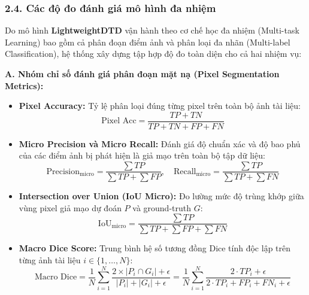 \subsubsection{2.4. Các độ đo đánh giá mô hình đa nhiệm}
\indent\indent Do mô hình \textbf{LightweightDTD} vận hành theo cơ chế học đa nhiệm (Multi-task Learning) bao gồm cả phân đoạn điểm ảnh và phân loại đa nhãn (Multi-label Classification), hệ thống xây dựng tập hợp độ đo toàn diện cho cả hai nhiệm vụ:\vspace{0.2cm}

\textbf{A. Nhóm chỉ số đánh giá phân đoạn mặt nạ (Pixel Segmentation Metrics):}
\begin{itemize}[label={--}, itemsep=2pt]
    \item \textbf{Pixel Accuracy:} Tỷ lệ phân loại đúng từng pixel trên toàn bộ ảnh tài liệu:
    \begin{equation}
    \text{Pixel Acc} = \frac{TP + TN}{TP + TN + FP + FN}
    \end{equation}
    \item \textbf{Micro Precision và Micro Recall:} Đánh giá độ chuẩn xác và độ bao phủ của các điểm ảnh bị phát hiện là giả mạo trên toàn bộ tập dữ liệu:
    \begin{equation}
    \text{Precision}_{\text{micro}} = \frac{\sum TP}{\sum TP + \sum FP}, \quad \text{Recall}_{\text{micro}} = \frac{\sum TP}{\sum TP + \sum FN}
    \end{equation}
    \item \textbf{Intersection over Union (IoU Micro):} Đo lường mức độ trùng khớp giữa vùng pixel giả mạo dự đoán $P$ và ground-truth $G$:
    \begin{equation}
    \text{IoU}_{\text{micro}} = \frac{\sum TP}{\sum TP + \sum FP + \sum FN}
    \end{equation}
    \item \textbf{Macro Dice Score:} Trung bình hệ số tương đồng Dice tính độc lập trên từng ảnh tài liệu $i \in \{1, \dots, N\}$:
    \begin{equation}
    \text{Macro Dice} = \frac{1}{N} \sum_{i=1}^{N} \frac{2 \times |P_i \cap G_i| + \epsilon}{|P_i| + |G_i| + \epsilon} = \frac{1}{N} \sum_{i=1}^{N} \frac{2 \cdot TP_i + \epsilon}{2 \cdot TP_i + FP_i + FN_i + \epsilon}
    \end{equation}
\end{itemize}

